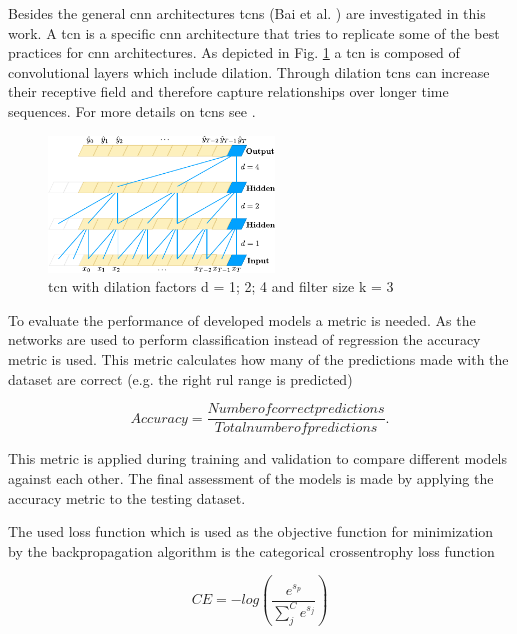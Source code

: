 \documentclass[conference]{IEEEtran}
\begin{document}
Besides the general \gls{cnn} architectures \glspl{tcn} (Bai et al. \cite{Bai2018}) are investigated in this work. A \gls{tcn} is a specific \gls{cnn} architecture that tries to replicate some of the best practices for \gls{cnn} architectures. As depicted in Fig. \ref{fig:tcn-architecture} a \gls{tcn} is composed of convolutional layers which include dilation. Through dilation \glspl{tcn} can increase their receptive field and therefore capture relationships over longer time sequences. For more details on \glspl{tcn} see \cite{Bai2018}.

\begin{figure}[htp]
	\centering
	\includegraphics[width=6cm]{tcn_architecture.pdf}
	\caption{\gls{tcn} with dilation factors d = 1; 2; 4 and filter size k = 3 \cite{Bai2018}}
	\label{fig:tcn-architecture}
\end{figure}



To evaluate the performance of developed models a metric is needed. As the networks are used to perform classification instead of regression the accuracy metric is used. This metric calculates how many of the predictions made with the dataset are correct (e.g. the right \gls{rul} range is predicted)

\begin{equation}
	\label{eq:categorical-cross-entrophy}
	Accuracy = \frac{Number of correct predictions}{Total number of predictions}.
\end{equation}

This metric is applied during training and validation to compare different models against each other. The final assessment of the models is made by applying the accuracy metric to the testing dataset.

The used loss function which is used as the objective function for minimization by the backpropagation algorithm is the categorical crossentrophy loss function

\begin{equation}
	\label{eq:categorical-cross-entrophy}
	CE = -log(\frac{e^{s_p}}{\sum_{j}^{C} e^{s_j}})	
\end{equation}
\end{document}
